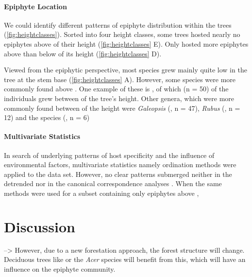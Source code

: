 \documentclass[12pt, a4paper, oneside, draft]{scrartcl}
\begin{document}
		
	
	
		\paragraph{Epiphyte Location}
		We could identify different patterns of epiphyte distribution within the trees (\autoref{fig:heightclasses}). Sorted into four height classes, some trees hosted nearly no epiphytes above  of their height (\autoref{fig:heightclasses} E). Only \apseudoplatanus hosted more epiphytes above than below  of its height (\autoref{fig:heightclasses} D).
		
		
	
		Viewed from the epiphytic perspective, most species grew mainly quite low in the tree at the stem base (\autoref{fig:heightclasses} A). However, some species were more commonly found above . One example of these is \saucuparia, of which  (n = 50) of the individuals grew between  of the tree's height. Other genera, which were more commonly found between  of the height were \textit{Galeopsis} (, n = 47), \textit{Rubus} (, n = 12) and the species \apseudoplatanus (, n = 6)
		
	\paragraph{Multivariate Statistics}
	In search of underlying patterns of host specificity and the influence of environmental factors, multivariate statistics namely ordination methods were applied to the data set. However, no clear patterns submerged neither in the detrended nor in the canonical correspondence analyses . When the same methods were used for a subset containing only epiphytes above , 
	
	

\section{Discussion}
\pabies -->  However, due to a new forestation approach, the forest structure will change. Deciduous trees like \fsylvatica or the  \textit{Acer} species will benefit from this, which will have an influence on the epiphyte community.
\end{document}
